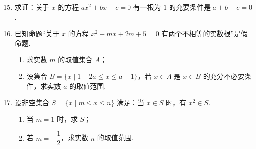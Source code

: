 \documentclass[a4paper,11pt]{article}
\begin{document}
\begin{enumerate}
\setcounter{enumi}{14}

\item 求证：关于 $x$ 的方程 $ax^2+bx+c=0$ 有一根为 $1$ 的充要条件是 $a+b+c=0$.


\ansspace[8]

\item 已知命题“关于 $x$ 的方程 $x^2+mx+2m+5=0$ 有两个不相等的实数根”是假命题.

\begin{enumerate}[label=(\arabic*)]
\item 求实数 $m$ 的取值集合 $A$；
\item 设集合 $B=\{x\mid 1-2a\leqslant x\leqslant a-1\}$，若 $x\in A$ 是 $x\in B$ 的充分不必要条件，求实数 $a$ 的取值范围.
\end{enumerate}

\ans{（1）$A=\{m\mid -2\leqslant m\leqslant 10\}$；（2）$[11,+\infty)$}

\ifanswer
\solbegin
\step{所以实数 $a$ 的取值范围为 $[11,+\infty)$.}
\solend

\fi

\ansspace[6]

\item 设非空集合 $S=\{x\mid m\leqslant x\leqslant n\}$ 满足：当 $x\in S$ 时，有 $x^2\in S$.

\begin{enumerate}[label=(\arabic*)]
\item 当 $m=1$ 时，求 $S$；
\item 若 $m=-\dfrac12$，求实数 $n$ 的取值范围.
\end{enumerate}


\end{enumerate}
\end{document}
